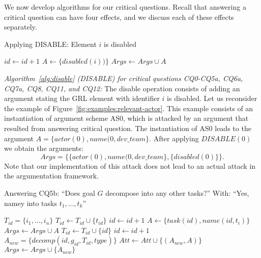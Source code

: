 We now develop algorithms for our critical questions. Recall that answering a critical question can have four effects, and we discuss each of these effects separately.

\begin{algorithm}[h]
  \caption{Applying DISABLE: Element $i$ is disabled}\label{alg:disable}
  \begin{algorithmic}[1]
    \State $id\gets id+1$
    \State $A\gets \{disabled(i))\}$
    \State $Args \gets Args\cup A$
    \EndProcedure
  \end{algorithmic}
\end{algorithm}

\emph{Algorithm~\ref{alg:disable} (\textsf{DISABLE}) for critical questions CQ0-CQ5a, CQ6a, CQ7a, CQ8, CQ11, and CQ12:} The disable operation consists of adding an argument stating the GRL element with identifier $i$ is disabled. Let us reconsider the example of Figure~\ref{fig:examples:relevant-actor}. This example consists of an instantiation of argument scheme AS0, which is attacked by an argument that resulted from answering critical question. The instantiation of AS0 leads to the argument $A=\{actor(0),name(0,dev\_team\}$. After applying $DISABLE(0)$ we obtain the arguments: $$Args=\{\{actor(0),name(0,dev\_team\}, \{disabled(0)\}\}.$$ Note that our implementation of this attack does not lead to an actual attack in the argumentation framework.

\begin{algorithm}[h]
  \caption{Answering CQ5b: ``Does goal $G$ decompose into any other tasks?'' With: ``Yes, namey into tasks $t_1,\ldots,t_k$''}\label{alg:cq5b}
  \begin{algorithmic}[1]
    \State $T_{id} = \{i_1,\ldots,i_n\}$
    \label{alg:cq5b:for1}
        \State $T_{id} \gets T_{id} \cup \{t_{id}\}$
      \Else
        \State $id\gets id+1$
        \State $A \gets \{task(id),name(id,t_i)\}$
        \State $Args \gets Args\cup A$
        \State $T_{id} \gets T_{id} \cup \{id\}$
      \EndIf
    \EndFor
    \State $id\gets id+1$
    \State $A_{new} = \{decomp(id, g_{id}, T_{id}, type)\}$\label{alg:cq5b:newarg}
    \label{alg:cq5b:for2}
      \State $Att\gets Att \cup \{(A_{new},A)\}$
    \EndFor
    \State $Args \gets Args \cup \{A_{new}\}$
    \EndProcedure
  \end{algorithmic}
\end{algorithm}

